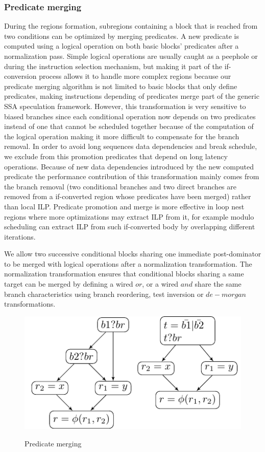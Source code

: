 \subsubsection{Predicate merging}

During the regions formation, subregions containing a block that is reached from two conditions can be optimized by merging predicates. A new predicate is computed using a logical operation on both basic blocks' predicates after a normalization pass. Simple logical operations are usually caught as a peephole or during the instruction selection mechanism, but making it part of the if-conversion process allows it to handle more complex regions because our predicate merging algorithm is not limited to basic blocks that only define predicates, making instructions depending of predicates merge part of the generic SSA speculation framework. However, this transformation is very sensitive to biased branches since each conditional operation now depends on two predicates instead of one that cannot be scheduled together because of the computation of the logical operation making it more difficult to compensate for the branch removal. In order to avoid long sequences data dependencies and break schedule, we exclude from this promotion predicates that depend on long latency operations.
Because of new data dependencies introduced by the new computed predicate the performance contribution of this transformation mainly comes from the branch removal (two conditional branches and two direct branches are removed from a if-converted region whose predicates have been merged) rather than local ILP. Predicate promotion and merge is more effective in loop nest regions where more optimizations may extract ILP from it, for example modulo scheduling can extract ILP from such if-converted body by overlapping different iterations. 

We allow two successive conditional blocks sharing one immediate post-dominator to be merged with logical operations after a normalization transformation. The normalization transformation ensures that conditional blocks sharing a same target can be merged by defining a wired $or$, or a wired $and$ share the same branch characteristics using branch reordering, test inversion or $de-morgan$ transformations.

\begin{figure}
  \includegraphics[scale=0.8]{phi_merge}
  \label{fig:phi_merge}
\caption{Predicate merging}
\end{figure}


